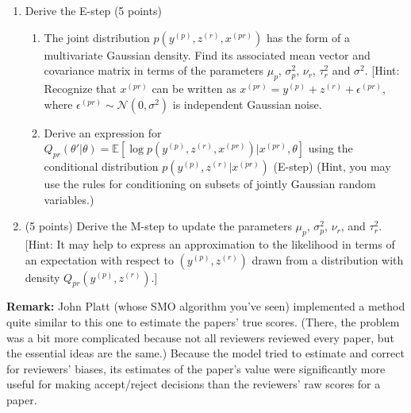 \documentclass[twoside,12pt]{article}
\begin{document}
\begin{enumerate}[label*=\arabic*.]
\item Derive the E-step (5 points)

\begin{enumerate}[label*=\arabic*.]
\item  The joint distribution $p(y^{(p)},z^{(r)},x^{(pr)})$ has the form of a multivariate Gaussian density. Find its associated mean vector and covariance matrix in terms of the parameters $\mu_p$, $\sigma_p^2$, $\nu_r$, $\tau_r^2$ and $\sigma^2$.
[Hint: Recognize that $x^{(pr)}$ can be written as $x^{(pr)} = y^{(p)} + z^{(r)} + \epsilon^{(pr)}$, where $\epsilon^{(pr)} \sim \mathcal{N}(0, \sigma^2)$ is independent Gaussian noise.

\item Derive an expression for $Q_{pr}(\theta'|\theta)  = \mathbb{E}[\log p(y^{(p)}, z^{(r)}, x^{(pr)})|x^{(pr)},\theta]$ using the conditional distribution $p(y^{(p)},z^{(r)}|x^{(pr)})$ (E-step) (Hint, you may use the rules for conditioning on subsets of jointly Gaussian random variables.) %
\end{enumerate}

\item (5 points) Derive the M-step to update the parameters $\mu_p$, $\sigma_p^2$, $\nu_r$, and $\tau_r^2$. [Hint: It may help to express an approximation to the likelihood in terms of an expectation with respect to $(y^{(p)}, z^{(r)})$ drawn from a distribution with density $Q_{pr}(y^{(p)}, z^{(r)})$.]

\end{enumerate}

{\bf Remark:} John Platt (whose SMO algorithm you've seen) implemented a method quite similar to this one to estimate the papers' true scores. (There, the problem was a bit more complicated because not all reviewers reviewed every paper, but the essential ideas are the same.) Because the model tried to estimate and correct for reviewers' biases, its estimates of the paper's value were significantly more useful for making accept/reject decisions than the reviewers' raw scores for a paper.




\printbibliography
\end{document}
